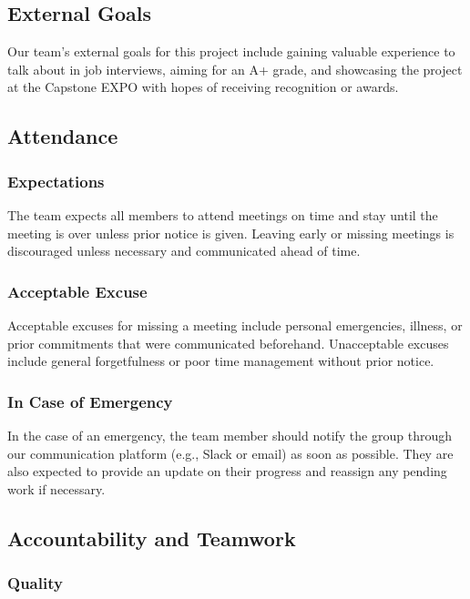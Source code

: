 \documentclass{article}
\begin{document}
\subsection*{External Goals}

Our team’s external goals for this project include gaining valuable experience to talk
about in job interviews, aiming for an A+ grade, and showcasing the project at the Capstone
EXPO with hopes of receiving recognition or awards.

\subsection*{Attendance}

\subsubsection*{Expectations}

The team expects all members to attend meetings on time and stay until the meeting is over
unless prior notice is given. Leaving early or missing meetings is discouraged unless 
necessary and communicated ahead of time.

\subsubsection*{Acceptable Excuse}

Acceptable excuses for missing a meeting include personal emergencies, illness, or prior
commitments that were communicated beforehand. Unacceptable excuses include general
forgetfulness or poor time management without prior notice.

\subsubsection*{In Case of Emergency}

In the case of an emergency, the team member should notify the group through our communication
platform (e.g., Slack or email) as soon as possible. They are also expected to provide an update
on their progress and reassign any pending work if necessary.

\subsection*{Accountability and Teamwork}

\subsubsection*{Quality} 
\end{document}
